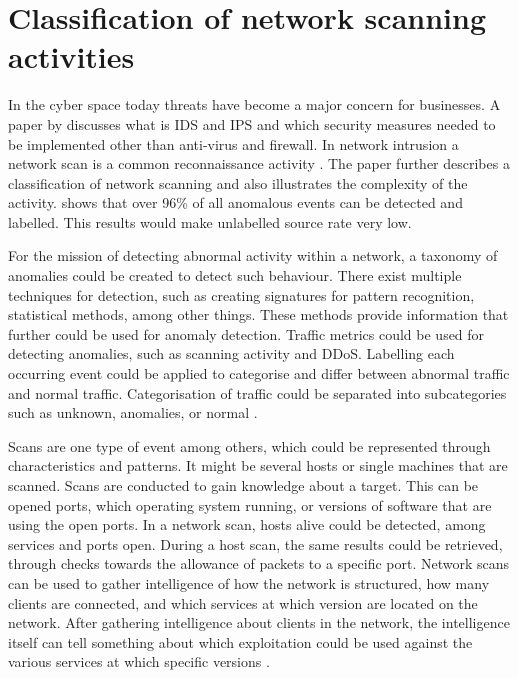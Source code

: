 \section{Classification of network scanning activities}
\label{s:ClassificationOfScanning}
In the cyber space today threats have become a major concern for businesses. A paper by \textcite{fekolkin2015intrusion} discusses what is IDS and IPS and which security measures needed to be implemented other than anti-virus and firewall. In network intrusion a network scan is a common reconnaissance activity \autocite{TaxonomyOfNetworkScanning}. The paper further describes a classification of network scanning and also illustrates the complexity of the activity. \textcite{Liu2014TowardsAT} shows that over 96\% of all anomalous events can be detected and labelled. This results would make unlabelled source rate very low.

For the mission of detecting abnormal activity within a network, a taxonomy of anomalies could be created to detect such behaviour. There exist multiple techniques for detection, such as creating signatures for pattern recognition, statistical methods, among other things. These methods provide information that further could be used for anomaly detection. Traffic metrics could be used for detecting anomalies, such as scanning activity and DDoS. Labelling each occurring event could be applied to categorise and differ between abnormal traffic and normal traffic. Categorisation of traffic could be separated into subcategories such as unknown, anomalies, or normal \autocite{6906328}.

Scans are one type of event among others, which could be represented through characteristics and patterns. It might be several hosts or single machines that are scanned. Scans are conducted to gain knowledge about a target. This can be opened ports, which operating system running, or versions of software that are using the open ports. In a network scan, hosts alive could be detected, among services and ports open. During a host scan, the same results could be retrieved, through checks towards the allowance of packets to a specific port. Network scans can be used to gather intelligence of how the network is structured, how many clients are connected, and which services at which version are located on the network. After gathering intelligence about clients in the network, the intelligence itself can tell something about which exploitation could be used against the various services at which specific versions \autocite{6906328}.

